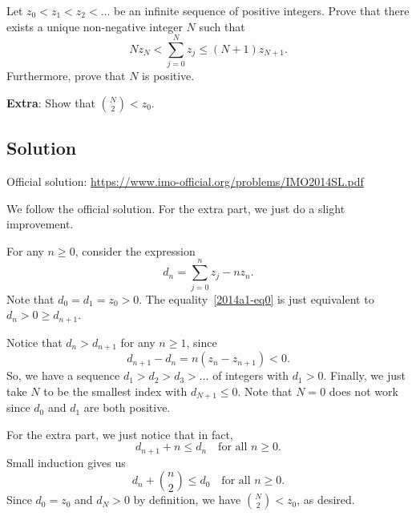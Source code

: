 Let $z_0 < z_1 < z_2 < \ldots$ be an infinite sequence of positive integers.
Prove that there exists a unique non-negative integer $N$ such that
\[ N z_N < \sum_{j = 0}^N z_j \leq (N + 1) z_{N + 1}. \tag{*}\label{2014a1-eq0} \]
Furthermore, prove that $N$ is positive.

\textbf{Extra}: Show that $\displaystyle \binom{N}{2} < z_0$.



\subsection*{Solution}

Official solution: \url{https://www.imo-official.org/problems/IMO2014SL.pdf}

We follow the official solution.
For the extra part, we just do a slight improvement.

For any $n \geq 0$, consider the expression
\[ d_n = \sum_{j = 0}^n z_j - n z_n. \]
Note that $d_0 = d_1 = z_0 > 0$.
The equality~\eqref{2014a1-eq0} is just equivalent to $d_n > 0 \geq d_{n + 1}$.

Notice that $d_n > d_{n + 1}$ for any $n \geq 1$, since
\[ d_{n + 1} - d_n = n (z_n - z_{n + 1}) < 0. \]
So, we have a sequence $d_1 > d_2 > d_3 > \ldots$ of integers with $d_1 > 0$.
Finally, we just take $N$ to be the smallest index with $d_{N + 1} \leq 0$.
Note that $N = 0$ does not work since $d_0$ and $d_1$ are both positive.

For the extra part, we just notice that in fact,
\[ d_{n + 1} + n \leq d_n \quad \text{for all } n \geq 0. \]
Small induction gives us
\[ d_n + \binom{n}{2} \leq d_0 \quad \text{for all } n \geq 0. \]
Since $d_0 = z_0$ and $d_N > 0$ by definition, we have $\displaystyle \binom{N}{2} < z_0$, as desired.
